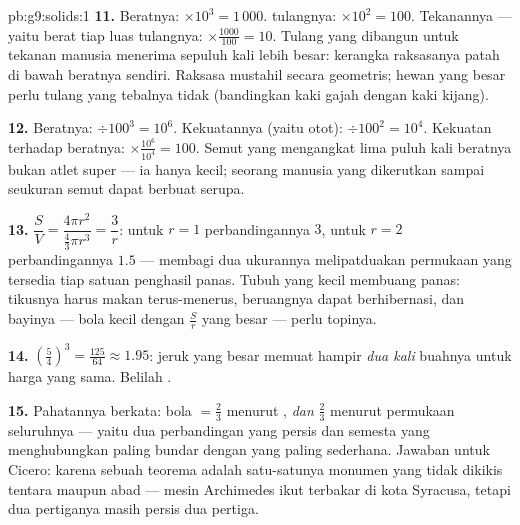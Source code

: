 \begin{solution}{pb:g9:solids:1}
\textbf{11.} Beratnya: $\times 10^3 = 1\,000$. 
tulangnya: $\times 10^2 = 100$. Tekanannya --- yaitu berat tiap
luas tulangnya: $\times \frac{1000}{100} = 10$. Tulang yang dibangun
untuk tekanan manusia menerima sepuluh kali lebih besar: kerangka
raksasanya patah di bawah beratnya sendiri. Raksasa mustahil secara
geometris; hewan yang besar perlu tulang yang tebalnya tidak
 (bandingkan kaki gajah dengan kaki kijang).

\textbf{12.} Beratnya: $\div 100^3 = 10^6$. Kekuatannya (yaitu
 otot): $\div 100^2 = 10^4$. Kekuatan terhadap beratnya:
$\times \frac{10^6}{10^4} = 100$. Semut yang mengangkat lima puluh
kali beratnya bukan atlet super --- ia hanya kecil; seorang manusia
yang dikerutkan sampai seukuran semut dapat berbuat serupa.

\textbf{13.} $\dfrac{S}{V} = \dfrac{4\pi r^2}{\frac43\pi r^3}
= \dfrac{3}{r}$: untuk $r = 1$ perbandingannya $3$, untuk $r = 2$
perbandingannya $1.5$ --- membagi dua ukurannya melipatduakan
permukaan yang tersedia tiap satuan  penghasil panas. Tubuh
yang kecil membuang panas: tikusnya harus makan terus-menerus,
beruangnya dapat berhibernasi, dan bayinya --- bola kecil dengan
$\frac Sr$ yang besar --- perlu topinya.

\textbf{14.} $\left(\frac54\right)^3 = \frac{125}{64} \approx
1.95$: jeruk yang besar memuat hampir \emph{dua kali} buahnya untuk
harga yang sama. Belilah .

\textbf{15.} Pahatannya berkata: bola $= \frac23$ 
menurut , \emph{dan} $\frac23$  menurut permukaan
seluruhnya --- yaitu dua perbandingan yang persis dan semesta yang
menghubungkan  paling bundar dengan yang paling
sederhana. Jawaban untuk Cicero: karena sebuah teorema adalah
satu-satunya monumen yang tidak dikikis tentara maupun abad ---
mesin Archimedes ikut terbakar di kota Syracusa, tetapi dua
pertiganya masih persis dua pertiga.

\end{solution}
